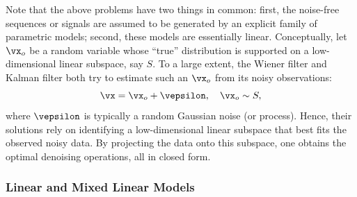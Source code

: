 \documentclass[../../book-main.tex]{subfiles}
\begin{document}
Note that the above problems have two things in common: first, the
noise-free sequences or signals are assumed to be generated by an
explicit family of parametric models; second, these models are
essentially linear. Conceptually, let \(\vx_{o}\) be a random
variable whose ``true'' distribution is supported on a
low-dimensional linear subspace, say \(S\). To a large extent, the
Wiener filter and Kalman filter both try to estimate such an
\(\vx_{o}\) from its noisy observations:
\begin{equation}
    \vx = \vx_{o} + \vepsilon, \quad \vx_{o} \sim S,
\end{equation}
where \(\vepsilon\) is typically a random Gaussian noise (or
process). Hence, their solutions rely on identifying a
low-dimensional linear subspace that best fits the observed noisy
data. By projecting the data onto this subspace, one obtains the
optimal denoising operations, all in closed form.

\subsubsection{Linear and Mixed Linear Models}
\label{sec:PCA-ICA}
\end{document}
